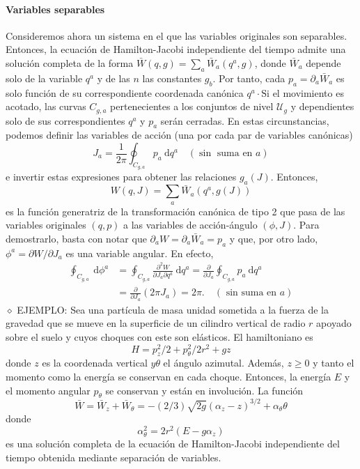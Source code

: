 \paragraph{Variables separables}
Consideremos ahora un sistema en el que las variables originales son separables. Entonces, la ecuación de Hamilton-Jacobi independiente del tiempo admite una solución completa de la forma $\bar{W}(q, g)=\sum_{a} \bar{W}_{a}\left(q^{a}, g\right)$, donde $\bar{W}_{a}$
depende solo de la variable $q^{a}$ y de las $n$ las constantes $g_{b}$. Por tanto, cada $p_{a}=\partial_{a} \bar{W}_{a}$ es solo función de su correspondiente coordenada canónica $q^{a} \cdot \mathrm{Si}$ el movimiento es acotado, las curvas $C_{g, a}$ pertenecientes a los conjuntos de nivel $\mathscr{U}_{g}$ y dependientes solo de sus correspondientes $q^{a}$ y $p_{a}$ serán cerradas. En estas circunstancias, podemos definir las variables de acción (una por cada par de variables canónicas)
$$
J_{a}=\frac{1}{2 \pi} \oint_{C_{g, a}} p_{a} \mathrm{~d} q^{a} \quad(\sin \text { suma en } a)
$$
e invertir estas expresiones para obtener las relaciones $g_{a}(J)$. Entonces,
$$
W(q, J)=\sum_{a} \bar{W}_{a}\left(q^{a}, g(J)\right)
$$
es la función generatriz de la transformación canónica de tipo 2 que pasa de las variables originales $(q, p)$ a las variables de acción-ángulo $(\phi, J)$. Para demostrarlo, basta con notar que $\partial_{a} W=\partial_{a} \bar{W}_{a}=p_{a}$ y que, por otro lado, $\phi^{a}=\partial W / \partial J_{a}$ es una variable angular. En efecto,
$$
\begin{aligned}
\oint_{C_{g, a}} \mathrm{~d} \phi^{a} & =\oint_{C_{g, a}} \frac{\partial^{2} W}{\partial J_{a} \partial q^{a}} \mathrm{~d} q^{a}=\frac{\partial}{\partial J_{a}} \oint_{C_{g, a}} p_{a} \mathrm{~d} q^{a} \\
& =\frac{\partial}{\partial J_{a}}\left(2 \pi J_{a}\right)=2 \pi . \quad(\text { sin suma en } a)
\end{aligned}
$$
$\diamond$ EJEMPLO: Sea una partícula de masa unidad sometida a la fuerza de la gravedad que se mueve en la superficie de un cilindro vertical de radio $r$ apoyado sobre el suelo y cuyos choques con este son elásticos. El hamiltoniano es
$$
H=p_{z}^{2} / 2+p_{\theta}^{2} / 2 r^{2}+g z
$$
donde $z$ es la coordenada vertical $y \theta$ el ángulo azimutal. Además, $z \geq 0$ y tanto el momento como la energía se conservan en cada choque. Entonces, la energía $E$ y el momento angular $p_{\theta}$ se conservan y están en involución. La función
$$
\bar{W}=\bar{W}_{z}+\bar{W}_{\theta}=-(2 / 3) \sqrt{2 g}\left(\alpha_{z}-z\right)^{3 / 2}+\alpha_{\theta} \theta
$$
donde
$$
\alpha_{\theta}^{2}=2 r^{2}\left(E-g \alpha_{z}\right)
$$
es una solución completa de la ecuación de Hamilton-Jacobi independiente del tiempo obtenida mediante separación de variables.

